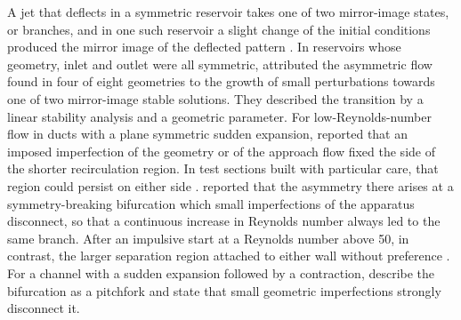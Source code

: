 \begin{en}[I-3]
A jet that deflects in a symmetric reservoir takes one of two mirror-image states, or branches, and in one such reservoir a slight change of the initial conditions produced the mirror image of the deflected pattern \citep{kantoushFlowFieldInvestigation2008}. In reservoirs whose geometry, inlet and outlet were all symmetric, \citet{dewalsExperimentalNumericalAnalysis2008} attributed the asymmetric flow found in four of eight geometries to the growth of small perturbations towards one of two mirror-image stable solutions. They described the transition by a linear stability analysis and a geometric parameter. For low-Reynolds-number flow in ducts with a plane symmetric sudden expansion, \citet{cherdronAsymmetricFlowsInstabilities1978}\unverified{} reported that an imposed imperfection of the geometry or of the approach flow fixed the side of the shorter recirculation region. In test sections built with particular care, that region could persist on either side \citep{cherdronAsymmetricFlowsInstabilities1978}\unverified{}. \citet{fearnNonlinearFlowPhenomena1990}\unverified{} reported that the asymmetry there arises at a symmetry-breaking bifurcation which small imperfections of the apparatus disconnect, so that a continuous increase in Reynolds number always led to the same branch. After an impulsive start at a Reynolds number above 50, in contrast, the larger separation region attached to either wall without preference \citep{fearnNonlinearFlowPhenomena1990}\unverified{}. For a channel with a sudden expansion followed by a contraction, \citet{mullinFlowSymmetricChannel2003} describe the bifurcation as a pitchfork and state that small geometric imperfections strongly disconnect it.
\end{en}
